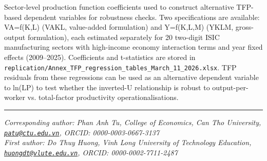 \documentclass[12pt,a4paper]{article}
\begin{document}
Sector-level production function coefficients used to construct
alternative TFP-based dependent variables for robustness checks. Two
specifications are available: VA=f(K,L) (VAKL, value-added formulation)
and Y=f(K,L,M) (YKLM, gross-output formulation), each estimated
separately for 20 two-digit ISIC manufacturing sectors with high-income
economy interaction terms and year fixed effects (2009--2025).
Coefficients and t-statistics are stored in
\texttt{replication/Annex\_TFP\_regression\_tables\_March\_11\_2026.xlsx}.
TFP residuals from these regressions can be used as an alternative
dependent variable to ln(LP) to test whether the inverted-U relationship
is robust to output-per-worker vs. total-factor productivity
operationalisations.

\begin{center}\rule{0.5\linewidth}{0.5pt}\end{center}

\emph{Corresponding author: Phan Anh Tu, College of Economics, Can Tho
University, \href{mailto:patu@ctu.edu.vn}{\nolinkurl{patu@ctu.edu.vn}},
ORCID: 0000-0003-0667-3137}\\
\emph{First author: Do Thuy Huong, Vinh Long University of Technology
Education,
\href{mailto:huongdt@vlute.edu.vn}{\nolinkurl{huongdt@vlute.edu.vn}},
ORCID: 0000-0002-7711-2487}
\end{document}

